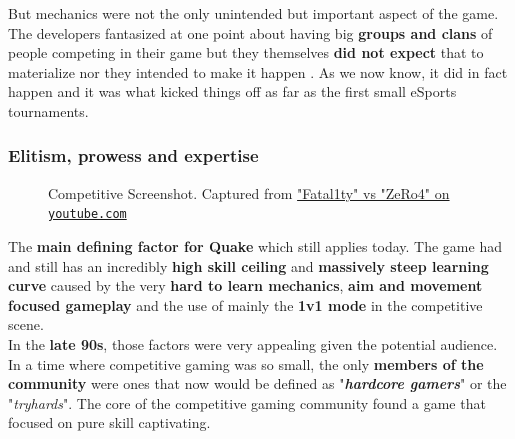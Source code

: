 But mechanics were not the only unintended but important aspect of the game. The developers fantasized at one point about having big \textbf{groups and clans} of people competing in their game but they themselves \textbf{did not expect} that to materialize nor they intended to make it happen \citep{clanHistory}. As we now know, it did in fact happen and it was what kicked things off as far as the first small eSports tournaments.

\subsubsection{Elitism, prowess and expertise}



\begin{figure}
	\begin{center}
		\caption{Competitive Screenshot. Captured from \href{https://www.youtube.com/watch?v=ka-5hEcU01k}{"Fatal1ty" vs "ZeRo4" on \nolinkurl{youtube.com}}}
	\end{center}
\end{figure}

The \textbf{main defining factor for Quake} which still applies today. The game had and still has an incredibly \textbf{high skill ceiling} and \textbf{massively steep learning curve} caused by the very \textbf{hard to learn mechanics}, \textbf{aim and movement focused gameplay} and the use of mainly the \textbf{1v1 mode} in the competitive scene.\\

In the \textbf{late 90s}, those factors were very appealing given the potential audience. In a time where competitive gaming was so small, the only \textbf{members of the community} were ones that now would be defined as "\textit{\textbf{hardcore gamers}}" or the "\textit{tryhards}". The core of the competitive gaming community found a game that focused on pure skill captivating.\\

